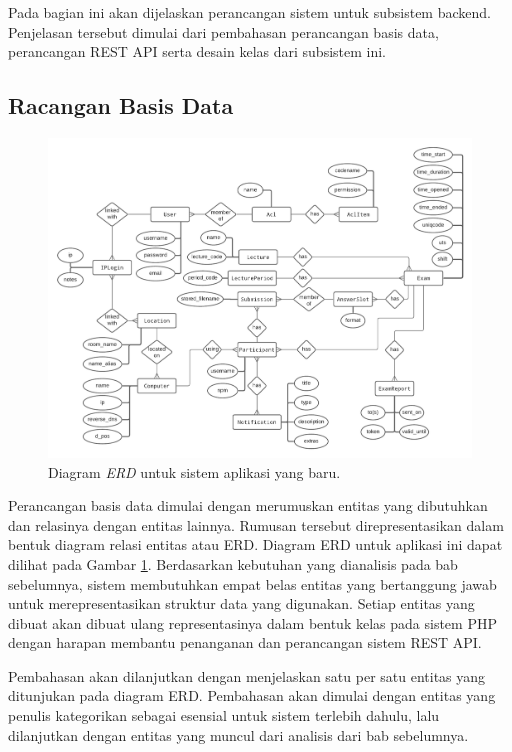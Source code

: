     Pada bagian ini akan dijelaskan perancangan sistem untuk subsistem backend. Penjelasan tersebut
    dimulai dari pembahasan perancangan basis data, perancangan REST API 
    serta desain kelas dari subsistem ini.
    
\subsection{Racangan Basis Data}
    \begin{figure}
        \centering
        \includegraphics[width=1\paperwidth]{Gambar/erd-rev-b.pdf}
        \caption{Diagram \textit{ERD} untuk sistem aplikasi yang baru.}
        \label{fig:erd_overview}
    \end{figure}
    
    Perancangan basis data dimulai dengan merumuskan entitas yang dibutuhkan dan relasinya
    dengan entitas lainnya. Rumusan tersebut direpresentasikan dalam bentuk diagram relasi
    entitas atau ERD. Diagram ERD untuk aplikasi ini dapat dilihat pada Gambar \ref{fig:erd_overview}.
    Berdasarkan kebutuhan yang dianalisis pada bab sebelumnya, sistem membutuhkan empat belas
    entitas yang bertanggung jawab untuk merepresentasikan struktur data yang digunakan.
    Setiap entitas yang dibuat akan dibuat ulang representasinya dalam bentuk kelas pada
    sistem PHP dengan harapan membantu penanganan dan perancangan sistem REST API.
    
    Pembahasan akan dilanjutkan dengan menjelaskan satu per satu entitas yang ditunjukan
    pada diagram ERD. Pembahasan akan dimulai dengan entitas yang penulis kategorikan sebagai
    esensial untuk sistem terlebih dahulu, lalu dilanjutkan dengan entitas yang muncul dari
    analisis dari bab sebelumnya.
    
